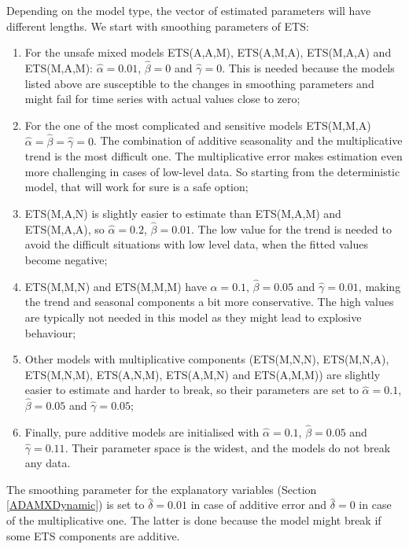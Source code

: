 \documentclass[]{book}
\providecommand{\tightlist}{%
  \setlength{\itemsep}{0pt}\setlength{\parskip}{0pt}}
\theoremstyle{definition}
\theoremstyle{definition}
\theoremstyle{definition}
\theoremstyle{definition}
\theoremstyle{remark}
\begin{document}
Depending on the model type, the vector of estimated parameters will have different lengths. We start with smoothing parameters of ETS:

\begin{enumerate}
\def\labelenumi{\arabic{enumi}.}
\tightlist
\item
  For the unsafe mixed models ETS(A,A,M), ETS(A,M,A), ETS(M,A,A) and ETS(M,A,M): \(\hat{\alpha}=0.01\), \(\hat{\beta}=0\) and \(\hat{\gamma}=0\). This is needed because the models listed above are susceptible to the changes in smoothing parameters and might fail for time series with actual values close to zero;
\item
  For the one of the most complicated and sensitive models ETS(M,M,A) \(\hat{\alpha}=\hat{\beta}=\hat{\gamma}=0\). The combination of additive seasonality and the multiplicative trend is the most difficult one. The multiplicative error makes estimation even more challenging in cases of low-level data. So starting from the deterministic model, that will work for sure is a safe option;
\item
  ETS(M,A,N) is slightly easier to estimate than ETS(M,A,M) and ETS(M,A,A), so \(\hat{\alpha}=0.2\), \(\hat{\beta}=0.01\). The low value for the trend is needed to avoid the difficult situations with low level data, when the fitted values become negative;
\item
  ETS(M,M,N) and ETS(M,M,M) have \(\hat{\alpha}=0.1\), \(\hat{\beta}=0.05\) and \(\hat{\gamma}=0.01\), making the trend and seasonal components a bit more conservative. The high values are typically not needed in this model as they might lead to explosive behaviour;
\item
  Other models with multiplicative components (ETS(M,N,N), ETS(M,N,A), ETS(M,N,M), ETS(A,N,M), ETS(A,M,N) and ETS(A,M,M)) are slightly easier to estimate and harder to break, so their parameters are set to \(\hat{\alpha}=0.1\), \(\hat{\beta}=0.05\) and \(\hat{\gamma}=0.05\);
\item
  Finally, pure additive models are initialised with \(\hat{\alpha}=0.1\), \(\hat{\beta}=0.05\) and \(\hat{\gamma}=0.11\). Their parameter space is the widest, and the models do not break any data.
\end{enumerate}

The smoothing parameter for the explanatory variables (Section \ref{ADAMXDynamic}) is set to \(\hat{\delta}=0.01\) in case of additive error and \(\hat{\delta}=0\) in case of the multiplicative one. The latter is done because the model might break if some ETS components are additive.
\end{document}
